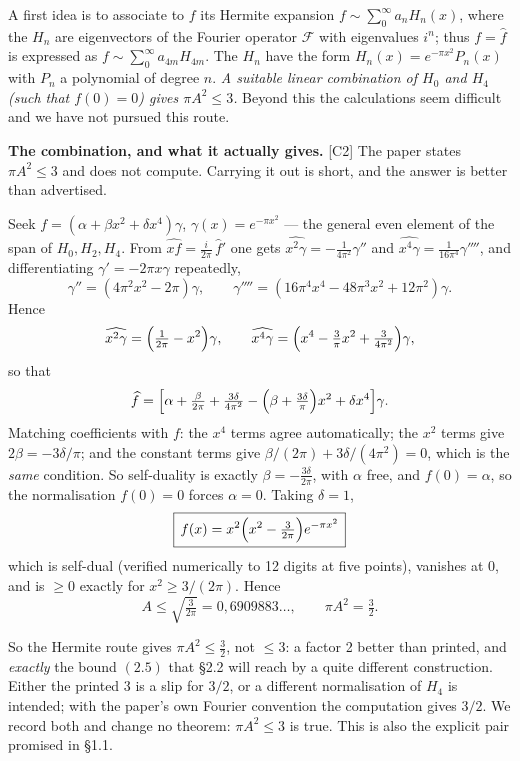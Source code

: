 \documentclass[11pt,reqno]{amsart}
\theoremstyle{plain}
\theoremstyle{definition}
\theoremstyle{remark}
\newcommand{\fh}{\widehat{f}}
\newcommand{\Ledger}[1]{{\scriptsize\textsf{[#1]}}}
\begin{document}
A first idea is to associate to $f$ its Hermite expansion
$f\sim\sum_0^\infty a_nH_n(x)$, where the $H_n$ are eigenvectors of the Fourier
operator $\mathcal F$ with eigenvalues $i^n$; thus $f=\fh$ is expressed as
$f\sim\sum_0^\infty a_{4m}H_{4m}$. The $H_n$ have the form $H_n(x)=e^{-\pi x^2}P_n(x)$
with $P_n$ a polynomial of degree $n$. \emph{A suitable linear combination of $H_0$
and $H_4$ (such that $f(0)=0$) gives $\pi A^2\le3$.} Beyond this the calculations seem
difficult and we have not pursued this route.

\begin{filled}
\textbf{The combination, and what it actually gives.} \Ledger{C2} The paper states
$\pi A^2\le3$ and does not compute. Carrying it out is short, and the answer is
better than advertised.

Seek $f=(\alpha+\beta x^2+\delta x^4)\gamma$, $\gamma(x)=e^{-\pi x^2}$ --- the general
even element of the span of $H_0,H_2,H_4$. From
$\widehat{xf}=\frac{i}{2\pi}\,\widehat f{}'$ one gets
$\widehat{x^2\gamma}=-\frac1{4\pi^2}\gamma''$ and
$\widehat{x^4\gamma}=\frac1{16\pi^4}\gamma''''$, and differentiating
$\gamma'=-2\pi x\gamma$ repeatedly,
\[\gamma''=(4\pi^2x^2-2\pi)\gamma,\qquad
  \gamma''''=(16\pi^4x^4-48\pi^3x^2+12\pi^2)\gamma .\]
Hence
\[\widehat{x^2\gamma}=\Bigl(\tfrac1{2\pi}-x^2\Bigr)\gamma,\qquad
  \widehat{x^4\gamma}=\Bigl(x^4-\tfrac{3}{\pi}x^2+\tfrac{3}{4\pi^2}\Bigr)\gamma,\]
so that
\[\fh=\Bigl[\alpha+\tfrac{\beta}{2\pi}+\tfrac{3\delta}{4\pi^2}
   -\Bigl(\beta+\tfrac{3\delta}{\pi}\Bigr)x^2+\delta x^4\Bigr]\gamma .\]
Matching coefficients with $f$: the $x^4$ terms agree automatically; the $x^2$ terms
give $2\beta=-3\delta/\pi$; and the constant terms give
$\beta/(2\pi)+3\delta/(4\pi^2)=0$, which is the \emph{same} condition. So
self-duality is exactly $\beta=-\tfrac{3\delta}{2\pi}$, with $\alpha$ free, and
$f(0)=\alpha$, so the normalisation $f(0)=0$ forces $\alpha=0$. Taking $\delta=1$,
\[\boxed{\,f(x)=x^2\Bigl(x^2-\tfrac{3}{2\pi}\Bigr)e^{-\pi x^2}\,}\]
which is self-dual (verified numerically to 12 digits at five points), vanishes at
$0$, and is $\ge0$ exactly for $x^2\ge3/(2\pi)$. Hence
\[A\le\sqrt{\tfrac{3}{2\pi}}=0{,}6909883\ldots,\qquad \pi A^2=\tfrac32 .\]

So the Hermite route gives $\pi A^2\le\tfrac32$, not $\le3$: a factor 2 better than
printed, and \emph{exactly} the bound $(2.5)$ that \S2.2 will reach by a quite
different construction. Either the printed $3$ is a slip for $3/2$, or a different
normalisation of $H_4$ is intended; with the paper's own Fourier convention the
computation gives $3/2$. We record both and change no theorem: $\pi A^2\le3$ is true.
This is also the explicit pair promised in \S1.1.
\end{filled}
\end{document}
